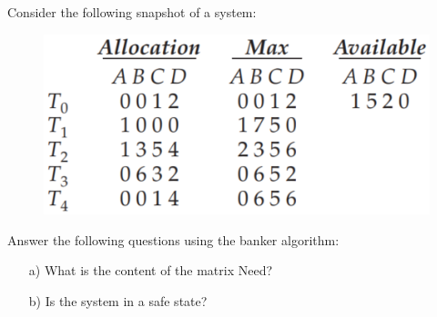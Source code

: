 \begin{exercise}[]{
    Consider the following snapshot of a system:
    
    \begin{figure}[h]
        \begin{center}
            \includegraphics[scale=1]{fig8.3.png}
        \end{center}
    \end{figure}

    Answer the following questions using the banker algorithm:
    
    
    \begin{enumerate}
        \item [a)]
    What is the content of the matrix Need?
    
    \item [b)]
    Is the system in a safe state?
    

\end{enumerate}}
\end{exercise}
